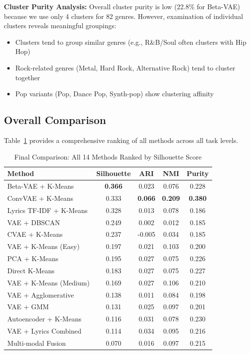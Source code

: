 \documentclass{article}
\begin{document}
\textbf{Cluster Purity Analysis:}
Overall cluster purity is low (22.8\% for Beta-VAE) because we use only 4 clusters for 82 genres. However, examination of individual clusters reveals meaningful groupings:
\begin{itemize}
    \item Clusters tend to group similar genres (e.g., R\&B/Soul often clusters with Hip Hop)
    \item Rock-related genres (Metal, Hard Rock, Alternative Rock) tend to cluster together
    \item Pop variants (Pop, Dance Pop, Synth-pop) show clustering affinity
\end{itemize}

\subsection{Overall Comparison}

Table~\ref{tab:final} provides a comprehensive ranking of all methods across all task levels.

\begin{table}[h]
\caption{Final Comparison: All 14 Methods Ranked by Silhouette Score}
\label{tab:final}
\centering
\small
\begin{tabular}{lcccc}
\toprule
Method & Silhouette & ARI & NMI & Purity \\
\midrule
Beta-VAE + K-Means & \textbf{0.366} & 0.023 & 0.076 & 0.228 \\
ConvVAE + K-Means & 0.333 & \textbf{0.066} & \textbf{0.209} & \textbf{0.380} \\
Lyrics TF-IDF + K-Means & 0.328 & 0.013 & 0.078 & 0.186 \\
VAE + DBSCAN & 0.249 & 0.002 & 0.012 & 0.185 \\
CVAE + K-Means & 0.237 & -0.005 & 0.034 & 0.185 \\
VAE + K-Means (Easy) & 0.197 & 0.021 & 0.103 & 0.200 \\
PCA + K-Means & 0.195 & 0.027 & 0.075 & 0.226 \\
Direct K-Means & 0.183 & 0.027 & 0.075 & 0.227 \\
VAE + K-Means (Medium) & 0.169 & 0.027 & 0.106 & 0.210 \\
VAE + Agglomerative & 0.138 & 0.011 & 0.084 & 0.198 \\
VAE + GMM & 0.131 & 0.025 & 0.097 & 0.201 \\
Autoencoder + K-Means & 0.116 & 0.031 & 0.078 & 0.230 \\
VAE + Lyrics Combined & 0.114 & 0.034 & 0.095 & 0.216 \\
Multi-modal Fusion & 0.070 & 0.016 & 0.097 & 0.215 \\
\bottomrule
\end{tabular}
\end{table}
\end{document}
